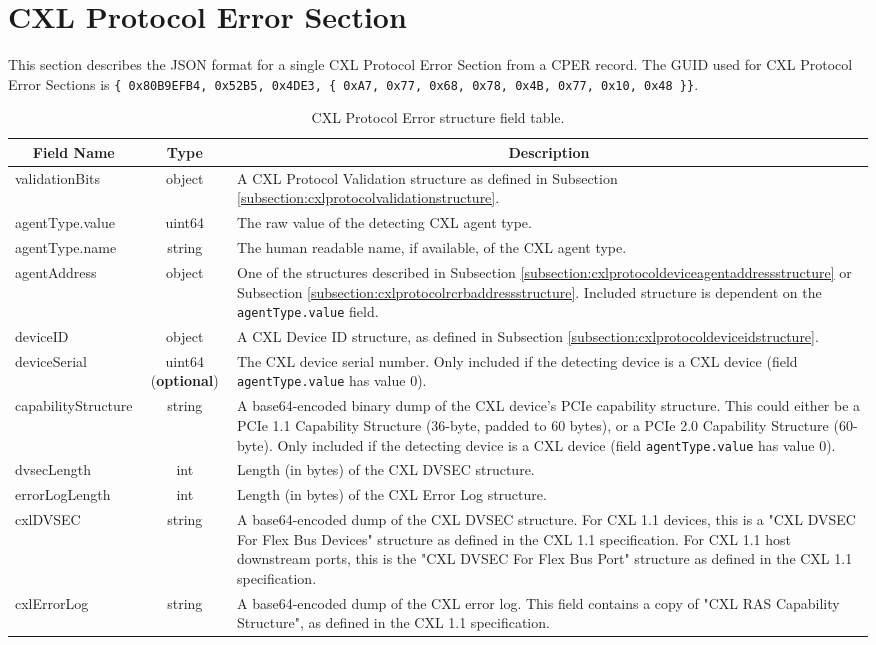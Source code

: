 \documentclass{report}
\newcommand*{\thead}[1]{\multicolumn{1}{|c|}{\bfseries #1}}
\newcommand*{\jsontable}[1]{
    \begin{table}[!ht]
    \label{#1}
    \centering
    \begin{adjustbox}{center}
    \begin{tabular}{|l|c|p{8cm}|}
    \hline
    \thead{Field Name} & \thead{Type} & \thead{Description} \\
    \hline
}
\newcommand*{\jsontableend}[1]{
    \hline
    \end{tabular}
    \end{adjustbox}
    \caption{#1}
    \label{table:#1}
    \end{table}
    \FloatBarrier
}
\begin{document}
\section{CXL Protocol Error Section}
\label{section:cxlprotocolerrorsection}
This section describes the JSON format for a single CXL Protocol Error Section from a CPER record. The GUID used for CXL Protocol Error Sections is \texttt{\{ 0x80B9EFB4, 0x52B5, 0x4DE3, \{ 0xA7, 0x77, 0x68, 0x78, 0x4B, 0x77, 0x10, 0x48 \}\}}.
\jsontable{table:cxlprotocolerrorsection}
validationBits & object & A CXL Protocol Validation structure as defined in Subsection \ref{subsection:cxlprotocolvalidationstructure}.\\
\hline
agentType.value & uint64 & The raw value of the detecting CXL agent type.\\
agentType.name & string & The human readable name, if available, of the CXL agent type.\\
\hline
agentAddress & object & One of the structures described in Subsection \ref{subsection:cxlprotocoldeviceagentaddressstructure} or Subsection \ref{subsection:cxlprotocolrcrbaddressstructure}. Included structure is dependent on the \texttt{agentType.value} field.\\
\hline
deviceID & object & A CXL Device ID structure, as defined in Subsection \ref{subsection:cxlprotocoldeviceidstructure}.\\
\hline
deviceSerial & uint64 (\textbf{optional}) & The CXL device serial number. Only included if the detecting device is a CXL device (field \texttt{agentType.value} has value 0).\\
\hline
capabilityStructure & string & A base64-encoded binary dump of the CXL device's PCIe capability structure. This could either be a PCIe 1.1 Capability Structure (36-byte, padded to 60 bytes), or a PCIe 2.0 Capability Structure (60-byte). Only included if the detecting device is a CXL device (field \texttt{agentType.value} has value 0).\\
\hline
dvsecLength & int & Length (in bytes) of the CXL DVSEC structure.\\
\hline
errorLogLength & int & Length (in bytes) of the CXL Error Log structure.\\
\hline
cxlDVSEC & string & A base64-encoded dump of the CXL DVSEC structure. For CXL 1.1 devices, this is a "CXL DVSEC For Flex Bus Devices" structure as defined in the CXL 1.1 specification. For CXL 1.1 host downstream ports, this is the "CXL DVSEC For Flex Bus Port" structure as defined in the CXL 1.1 specification.\\
\hline
cxlErrorLog & string & A base64-encoded dump of the CXL error log. This field contains a copy of "CXL RAS Capability Structure", as defined in the CXL 1.1 specification.\\
\jsontableend{CXL Protocol Error structure field table.}
\end{document}
